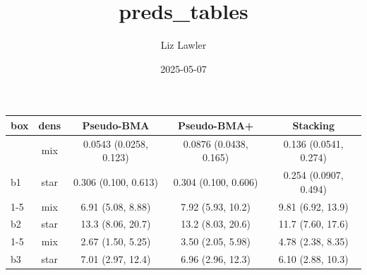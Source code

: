 \documentclass[
]{article}
\title{preds\_tables}
\author{Liz Lawler}
\date{2025-05-07}
\begin{document}
\maketitle

\begin{tabular}[t]{lcccc}
\toprule
box & dens & Pseudo-BMA & Pseudo-BMA+ & Stacking\\
\midrule
 & mix & 0.0543 (0.0258, 0.123) & 0.0876 (0.0438, 0.165) & 0.136 (0.0541, 0.274)\\

\multirow{-2}{*}{\raggedright\arraybackslash b1} & star & 0.306 (0.100, 0.613) & 0.304 (0.100, 0.606) & 0.254 (0.0907, 0.494)\\
\cmidrule{1-5}
 & mix & 6.91 (5.08, 8.88) & 7.92 (5.93, 10.2) & 9.81 (6.92, 13.9)\\

\multirow{-2}{*}{\raggedright\arraybackslash b2} & star & 13.3 (8.06, 20.7) & 13.2 (8.03, 20.6) & 11.7 (7.60, 17.6)\\
\cmidrule{1-5}
 & mix & 2.67 (1.50, 5.25) & 3.50 (2.05, 5.98) & 4.78 (2.38, 8.35)\\

\multirow{-2}{*}{\raggedright\arraybackslash b3} & star & 7.01 (2.97, 12.4) & 6.96 (2.96, 12.3) & 6.10 (2.88, 10.3)\\
\bottomrule
\end{tabular}
\end{document}
